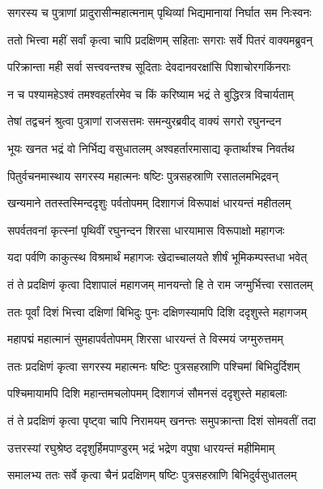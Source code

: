 \twolineshloka
{सगरस्य च पुत्राणां प्रादुरासीन्महात्मनाम्}
{पृथिव्यां भिद्यमानायां निर्घात सम निःस्वनः} %

\twolineshloka
{ततो भित्त्वा महीं सर्वां कृत्वा चापि प्रदक्षिणम्}
{सहिताः सगराः सर्वे पितरं वाक्यमब्रुवन्} %

\twolineshloka
{परिक्रान्ता मही सर्वा सत्त्ववन्तश्च सूदिताः}
{देवदानवरक्षांसि पिशाचोरगकिंनराः} %

\twolineshloka
{न च पश्यामहेऽश्वं तमश्वहर्तारमेव च}
{किं करिष्याम भद्रं ते बुद्धिरत्र विचार्यताम्} %

\twolineshloka
{तेषां तद्वचनं श्रुत्वा पुत्राणां राजसत्तमः}
{समन्युरब्रवीद् वाक्यं सगरो रघुनन्दन} %

\twolineshloka
{भूयः खनत भद्रं वो निर्भिद्य वसुधातलम्}
{अश्वहर्तारमासाद्य कृतार्थाश्च निवर्तथ} %

\twolineshloka
{पितुर्वचनमास्थाय सगरस्य महात्मनः}
{षष्टिः पुत्रसहस्राणि रसातलमभिद्रवन्} %

\twolineshloka
{खन्यमाने ततस्तस्मिन्ददृशुः पर्वतोपमम्}
{दिशागजं विरूपाक्षं धारयन्तं महीतलम्} %

\twolineshloka
{सपर्वतवनां कृत्स्नां पृथिवीं रघुनन्दन}
{शिरसा धारयामास विरूपाक्षो महागजः} %

\twolineshloka
{यदा पर्वणि काकुत्स्थ विश्रमार्थं महागजः}
{खेदाच्चालयते शीर्षं भूमिकम्पस्तधा भवेत्} %

\twolineshloka
{तं ते प्रदक्षिणं कृत्वा दिशापालं महागजम्}
{मानयन्तो हि ते राम जग्मुर्भित्त्वा रसातलम्} %

\twolineshloka
{ततः पूर्वां दिशं भित्त्वा दक्षिणां बिभिदुः पुनः}
{दक्षिणस्यामपि दिशि ददृशुस्ते महागजम्} %

\twolineshloka
{महापद्मं महात्मानं सुमहापर्वतोपमम्}
{शिरसा धारयन्तं ते विस्मयं जग्मुरुत्तमम्} %

\twolineshloka
{ततः प्रदक्षिणं कृत्वा सगरस्य महात्मनः}
{षष्टिः पुत्रसहस्राणि पश्चिमां बिभिदुर्दिशम्} %

\twolineshloka
{पश्चिमायामपि दिशि महान्तमचलोपमम्}
{दिशागजं सौमनसं ददृशुस्ते महाबलाः} %

\twolineshloka
{तं ते प्रदक्षिणं कृत्वा पृष्ट्वा चापि निरामयम्}
{खनन्तः समुपक्रान्ता दिशं सोमवतीं तदा} %

\twolineshloka
{उत्तरस्यां रघुश्रेष्ठ ददृशुर्हिमपाण्डुरम्}
{भद्रं भद्रेण वपुषा धारयन्तं महीमिमाम्} %

\twolineshloka
{समालभ्य ततः सर्वे कृत्वा चैनं प्रदक्षिणम्}
{षष्टिः पुत्रसहस्राणि बिभिदुर्वसुधातलम्} %

